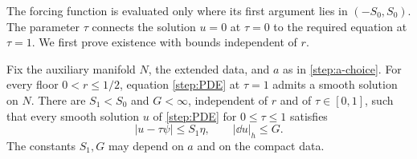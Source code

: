 The forcing function is evaluated only where its first argument lies in
$(-S_0,S_0)$.  The parameter $\tau$ connects the solution $u=0$ at
$\tau=0$ to the required equation at $\tau=1$.  We first prove existence
with bounds independent of $r$.

\begin{lemma}\label{step:existence}
Fix the auxiliary manifold $N$, the extended data, and $a$ as in
\eqref{step:a-choice}. For every floor $0<r\le1/2$, equation
\eqref{step:PDE} at $\tau=1$ admits a smooth solution on $N$.
There are $S_1<S_0$ and $G<\infty$, independent of $r$ and of
$\tau\in[0,1]$, such that every smooth solution $u$ of \eqref{step:PDE} for
$0\le\tau\le1$ satisfies
\begin{equation}\label{step:C01}
 |u-\tau\psi|\le S_1\eta,\qquad |\dd u|_h\le G.
\end{equation}
The constants $S_1,G$ may depend on $a$ and on the compact data.
\end{lemma}

